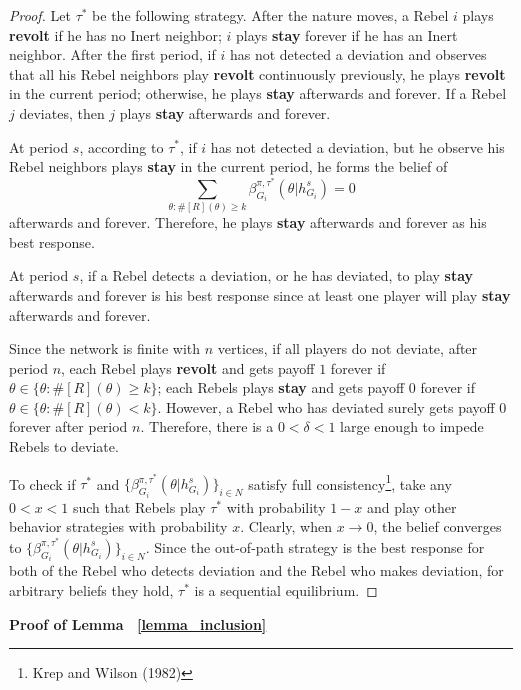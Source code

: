 \documentclass[12pt,letter]{article}
\newtheorem*{lemma*}{Lemma}
\theoremstyle{definition}
\theoremstyle{remark}
\theoremstyle{claim}
\begin{document}
\begin{proof}
Let $\tau^{*}$ be the following strategy. After the nature moves, a Rebel $i$ plays \textbf{revolt} if he has no Inert neighbor; $i$ plays \textbf{stay} forever if he has an Inert neighbor. After the first period, if $i$ has not detected a deviation and observes that all his Rebel neighbors play \textbf{revolt} continuously previously, he plays \textbf{revolt} in the current period; otherwise, he plays \textbf{stay} afterwards and forever. If a Rebel $j$ deviates, then $j$ plays \textbf{stay} afterwards and forever.

At period $s$, according to $\tau^{*}$, if $i$ has not detected a deviation, but he observe his Rebel neighbors plays \textbf{stay} in the current period, he forms the belief of \[\sum_{\theta:\#[R](\theta)\geq k}\beta^{\pi,\tau^*}_{G_i}(\theta|h^{s}_{G_i})=0\] afterwards and forever. Therefore, he plays \textbf{stay} afterwards and forever as his best response. 

At period $s$, if a Rebel detects a deviation, or he has deviated, to play \textbf{stay} afterwards and forever is his best response since at least one player will play \textbf{stay} afterwards and forever. 

Since the network is finite with $n$ vertices, if all players do not deviate, after period $n$, each Rebel plays \textbf{revolt} and gets payoff $1$ forever if $\theta\in \{\theta: \#[R](\theta)\geq k\}$; each Rebels plays \textbf{stay} and gets payoff $0$ forever if $\theta\in \{\theta: \#[R](\theta)< k\}$. However, a Rebel who has deviated surely gets payoff $0$ forever after period $n$. Therefore, there is a $0<\delta<1$ large enough to impede Rebels to deviate.

To check if $\tau^{*}$ and $\{\beta^{\pi,\tau^*}_{G_i}(\theta|h^{s}_{G_i})\}_{i\in N}$ satisfy full consistency\footnote{Krep and Wilson (1982)}, take any $0<x<1$ such that Rebels play $\tau^{*}$ with probability $1-x$ and play other behavior strategies with probability $x$. Clearly, when $x \rightarrow 0$, the belief converges to $\{\beta^{\pi,\tau^*}_{G_i}(\theta|h^{s}_{G_i})\}_{i\in N}$. Since the out-of-path strategy is the best response for both of the Rebel who detects deviation and the Rebel who makes deviation, for arbitrary beliefs they hold, $\tau^{*}$ is a sequential equilibrium.
\end{proof}
%
%
\bigskip
\noindent\textbf{Proof of Lemma ~\ref{lemma_inclusion}}
\end{document}
